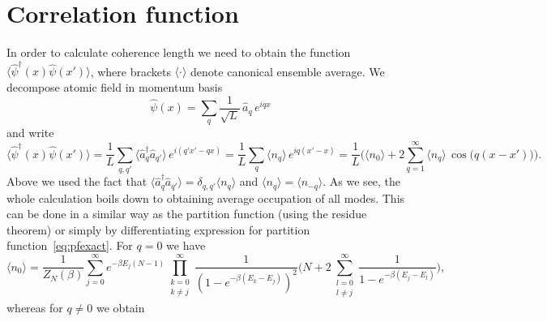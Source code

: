 \documentclass[aps,pra,reprint]{revtex4-2}
\begin{document}
\section{Correlation function}
In order to calculate coherence length we need to obtain  the function 
$\langle \hat{\psi}^{\dag}(x) \hat{\psi}(x') \rangle$, where brackets 
$\langle \cdot \rangle$ denote canonical ensemble average. We decompose atomic 
field in momentum basis
\begin{equation}
\label{eq:atomic}
\hat{\psi}(x) = \sum _q \frac{1}{\sqrt{L}} \, \hat{a}_q \, e^{i q x}
\end{equation}
and write
\begin{equation}
\langle \hat{\psi}^{\dag}(x) \hat{\psi}(x') \rangle = \frac{1}{L} \sum_{q,q'} 
\langle \hat{a}_q^{\dag} \hat{a}_{q'} \rangle \, e^{i (q'x'-qx)} = \frac{1}{L} 
\sum_{q} \langle n_q \rangle \, e^{i q(x'-x)} = \frac{1}{L} \bigg(\langle n_0 
\rangle + 2\sum_{q=1}^{\infty} \langle n_q \rangle \, \cos \big(q(x-x')\big) 
\bigg).
\end{equation}
Above we used the fact that $\langle \hat{a}_q^{\dag} \hat{a}_{q'} \rangle = 
\delta_{q,q'} \langle n_q \rangle$ and $\langle n_q \rangle = \langle n_{-q} 
\rangle$. As we see, the whole calculation boils down to obtaining average 
occupation of all modes. This can be done in a similar way as the partition 
function (using the residue theorem) or simply by differentiating expression 
for partition function~\eqref{eq:pfexact}. For $q=0$ we have
\begin{equation}
\label{eq:avzero}
\langle n_0 \rangle = \frac{1}{Z_N(\beta)} \sum_{j=0}^{\infty} 
e^{-\beta E_j (N-1)} \prod_{\substack{k=0 \\ k \neq j}}^{\infty} 
\frac{1}{(1-e^{-\beta (E_k-E_j)})^2} 
\Bigg(N + 2\sum_{\substack{l=0 \\ l \neq j}}^{\infty} 
\frac{1}{1-e^{-\beta (E_j-E_l)}} \Bigg),
\end{equation}
whereas for $q \neq 0$ we obtain
\end{document}
